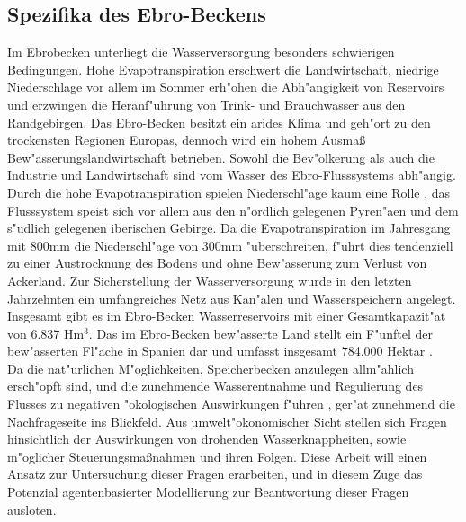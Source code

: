 \documentclass[11pt,a4paper]{article}
\begin{document}
\subsection{Spezifika des Ebro-Beckens}
Im Ebrobecken unterliegt die Wasserversorgung besonders schwierigen Bedingungen. Hohe Evapotranspiration erschwert die Landwirtschaft, niedrige Niederschlage vor allem im Sommer erh"ohen die Abh"angigkeit von Reservoirs und erzwingen die Heranf"uhrung von Trink- und Brauchwasser aus den Randgebirgen. Das Ebro-Becken besitzt ein arides Klima und geh"ort zu den trockensten Regionen Europas, dennoch wird ein hohem Ausmaß Bew"asserungslandwirtschaft betrieben. Sowohl die Bev"olkerung als auch die Industrie und Landwirtschaft sind vom Wasser des Ebro-Flusssystems ab\-h"an\-gig. Durch die hohe Evapotranspiration spielen Niederschl"age kaum eine Rolle \citep{Salvador2011}, das Flusssystem speist sich vor allem aus den n"ordlich gelegenen Pyren"aen und dem s"udlich gelegenen iberischen Gebirge. Da die Evapotranspiration im Jahresgang mit 800mm die Niederschl"age von 300mm \citep{Penagos2007} "uberschreiten, f"uhrt dies tendenziell zu einer Austrocknung des Bodens und ohne Bew"asserung zum Verlust von Ackerland. Zur Sicherstellung der Wasserversorgung wurde in den letzten Jahrzehnten ein umfangreiches Netz aus Kan"alen und Wasserspeichern angelegt. Insgesamt gibt es im Ebro-Becken Wasserreservoirs mit einer Gesamtkapazit"at von 6.837 Hm$^{3}$. Das im Ebro-Becken bew"asserte Land stellt ein F"unftel der bew"asserten Fl"ache in Spanien dar und umfasst insgesamt 784.000 Hektar \cite{Salvador2011}.\\

Da die nat"urlichen M"oglichkeiten, Speicherbecken anzulegen allm"ahlich ersch"opft sind, und die zunehmende Wasserentnahme und Regulierung des Flusses zu negativen "okologischen Auswirkungen f"uhren \citep{Alcacer2005}, ger"at zunehmend die Nachfrageseite ins Blickfeld. Aus um\-welt\-"oko\-nom\-ischer Sicht stellen sich Fragen hinsichtlich der Auswirkungen von drohenden Wasserknappheiten, sowie m"oglicher Steuerungsmaßnahmen und ihr\-en Folgen. Diese Arbeit will einen Ansatz zur Untersuchung dieser Fragen erarbeiten, und in diesem Zuge das Potenzial agentenbasierter Modellierung zur Beantwortung dieser Fragen ausloten.
\end{document}
